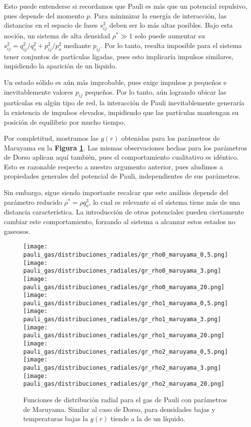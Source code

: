 Esto puede entenderse si recordamos que Pauli es más que un potencial repulsivo, pues depende del momento $p$. 
Para minimizar la energía de interacción, las distancias en el espacio de fases $s_{ij}^2$ deben ser lo más altas posibles.
Bajo esta noción, un sistema de alta densidad $\rho^*\gg1$ solo puede aumentar su $s_{ij}^2 = q_{ij}^2/q_o^2 + p_{ij}^2/p_o^2$ mediante $p_{ij}$.
Por lo tanto, resulta imposible para el sistema tener conjuntos de partículas ligadas, pues esto implicaría impulsos similares, impidiendo la aparición de un líquido.

Un estado sólido es aún más improbable, pues exige impulsos $p$ pequeños e inevitablemente valores $p_{ij}$ pequeños.
Por lo tanto, aún logrando ubicar las partículas en algún tipo de red, la interacción de Pauli inevitablemente generaría la existencia de impulsos elevados, impidiendo que las partículas mantengan
su posición de equilibrio por mucho tiempo.

Por completitud, mostramos las $g(r)$ obtenidas para los parámetros de Maruyama en la \textbf{Figura \ref{fig:gr_maruyama}}.
Las mismas observaciones hechas para los parámetros de Dorso aplican aquí también, pues el comportamiento cualitativo es idéntico. 
Esto es razonable respecto a nuestro argumento anterior, pues aludimos a propiedades generales del potencial de Pauli, independientes de sus parámetros.

Sin embargo, sigue siendo importante recalcar que este análisis depende del parámetro reducido $\rho^*=\rho q_o^3$, lo cual es relevante si el sistema tiene más de una distancia característica.
La introducción de otros potenciales pueden ciertamente cambiar este comportamiento, forzando al sistema a alcanzar estos estados no gaseosos. 

\begin{figure}[H]
	\centering
	\texttt{[image: pauli\_gas/distribuciones\_radiales/gr\_rho0\_maruyama\_0,5.png]}
	\texttt{[image: pauli\_gas/distribuciones\_radiales/gr\_rho0\_maruyama\_3.png]}
	\texttt{[image: pauli\_gas/distribuciones\_radiales/gr\_rho0\_maruyama\_20.png]}
	\texttt{[image: pauli\_gas/distribuciones\_radiales/gr\_rho1\_maruyama\_0,5.png]}
	\texttt{[image: pauli\_gas/distribuciones\_radiales/gr\_rho1\_maruyama\_3.png]}
	\texttt{[image: pauli\_gas/distribuciones\_radiales/gr\_rho1\_maruyama\_20.png]}
	\texttt{[image: pauli\_gas/distribuciones\_radiales/gr\_rho2\_maruyama\_0,5.png]}
	\texttt{[image: pauli\_gas/distribuciones\_radiales/gr\_rho2\_maruyama\_3.png]}
	\texttt{[image: pauli\_gas/distribuciones\_radiales/gr\_rho2\_maruyama\_20.png]}
	\caption{Funciones de distribución radial para el gas de Pauli con parámetros de Maruyama.
	Similar al caso de Dorso, para densidades bajas y temperaturas bajas la $g(r)$ tiende a la de un líquido.}
	\label{fig:gr_maruyama}
\end{figure}

